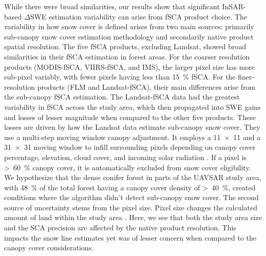 While there were broad similarities, our results show that significant InSAR-based $\Delta$SWE estimation variability can arise from fSCA product choice. The variability in how snow cover is defined arises from two main sources: primarily sub-canopy snow cover estimation methodology and secondarily native product spatial resolution. The five fSCA products, excluding Landsat, showed broad similarities in their fSCA estimation in forest areas. For the coarser resolution products (MODIS-fSCA, VIIRS-fSCA, and IMS), the larger pixel size has more sub-pixel variably, with fewer pixels having less than 15~\% fSCA. For the finer-resolution products (FLM and Landsat-fSCA), their main differences arise from the sub-canopy fSCA estimation. The Landsat-fSCA data had the greatest variability in fSCA across the study area, which then propagated into SWE gains and losses of lesser magnitude when compared to the other five products. These losses are driven by how the Landsat data estimate sub-canopy snow cover. They use a multi-step moving window canopy adjustment. It employs a 11~$\times$~11 and a 31~$\times$~31 moving window to infill surrounding pixels depending on canopy cover percentage, elevation, cloud cover, and incoming solar radiation \citep{selkowitzUSGSLandsatSnow2017}. If a pixel is >~60~\% canopy cover, it is automatically excluded from snow cover eligibility. We hypothesize that the dense conifer forest in parts of the UAVSAR study area, with 48~\% of the total forest having a canopy cover density of >~40~\%, created conditions where the algorithm didn't detect sub-canopy snow cover. The second source of uncertainty stems from the pixel size. Pixel size changes the calculated amount of land within the study area \cite{bairHowTradeoffsSatellite2023}. Here, we see that both the study area size and the SCA precision are affected by the native product resolution. This impacts the snow line estimates yet was of lesser concern when compared to the canopy cover considerations.

